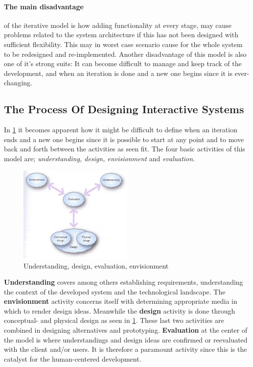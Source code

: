 \paragraph{The main disadvantage} of the iterative model is how adding functionality at every stage, may cause problems related to the system architecture 
if this has not been designed with sufficient flexibility.
This may in worst case scenario cause for the whole system to be redesigned and re-implemented.
Another disadvantage of this model is also one of it's strong suits:
It can become difficult to manage and keep track of the development, and when an iteration is done and a new one begins since it is ever-changing.

\subsection{The Process Of Designing Interactive Systems}\label{sec:Iterative1}
In \cref{fig:DEBModel} it becomes apparent how it might be difficult to define when an iteration ends and a new one begins since it is possible to start at any point and to move back and forth between the activities as seen fit.
The four basic activities of this model are; \textit{understanding, design, envisionment} and \textit{evaluation}.

\begin{figure}[H]
	\centering
	\includegraphics[width=0.5\textwidth]{billeder/DEBModel.jpg}
	\caption{Understanding, design, evaluation, envisionment \citep[p.~49]{Benyon}}\label{fig:DEBModel}
\end{figure}

\textbf{Understanding} covers among others establishing requirements, understanding the context of the developed system and the technological landscape.
The \textbf{envisionment} activity concerns itself with determining appropriate media in which to render design ideas.
Meanwhile the \textbf{design} activity is done through conceptual- and physical design as seen in \cref{fig:DEBModel}.
These last two activities are combined in designing alternatives and prototyping.
\textbf{Evaluation} at the center of the model is where understandings and design ideas are confirmed or reevaluated with the client and/or users.
It is therefore a paramount activity since this is the catalyst for the human-centered development.


